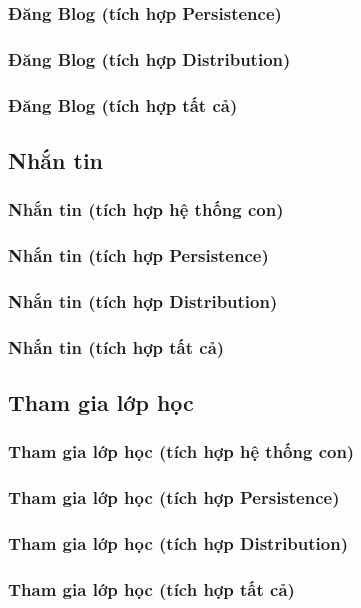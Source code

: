 \documentclass[./../main.tex]{subfiles}
\begin{document}
\subsubsection{Đăng Blog (tích hợp Persistence)}
\subsubsection{Đăng Blog (tích hợp Distribution)}
\subsubsection{Đăng Blog (tích hợp tất cả)}

\subsection{Nhắn tin}
\subsubsection{Nhắn tin (tích hợp hệ thống con)}
\subsubsection{Nhắn tin (tích hợp Persistence)}
\subsubsection{Nhắn tin (tích hợp Distribution)}
\subsubsection{Nhắn tin (tích hợp tất cả)}

\subsection{Tham gia lớp học}
\subsubsection{Tham gia lớp học (tích hợp hệ thống con)}
\subsubsection{Tham gia lớp học (tích hợp Persistence)}
\subsubsection{Tham gia lớp học (tích hợp Distribution)}
\subsubsection{Tham gia lớp học (tích hợp tất cả)}
\end{document}
